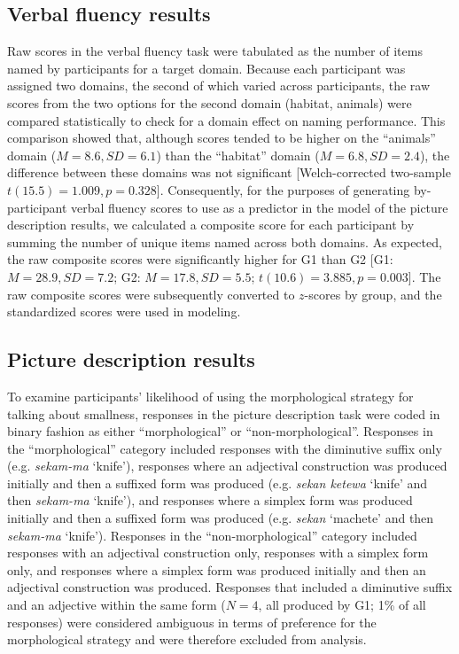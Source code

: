 \documentclass[output=paper,colorlinks,citecolor=brown]{langscibook}
\begin{document}
\subsection{Verbal fluency results}
\label{VFTResultsSec}

Raw scores in the verbal fluency task were tabulated as the number of items named by participants for a target domain. Because each participant was assigned two domains, the second of which varied across participants, the raw scores from the two options for the second domain (habitat, animals) were compared statistically to check for a domain effect on naming performance. This comparison showed that, although scores tended to be higher on the “animals” domain ($M=8.6, SD=6.1$) than the “habitat” domain ($M=6.8, SD=2.4$), the difference between these domains was not significant [Welch-corrected two-sample $t(15.5)=1.009, p=0.328$]. Consequently, for the purposes of generating by-participant verbal fluency scores to use as a predictor in the model of the picture description results, we calculated a composite score for each participant by summing the number of unique items named across both domains. As expected, the raw composite scores were significantly higher for G1 than G2 [G1: $M=28.9, SD=7.2$; G2: $M=17.8, SD=5.5$; $t(10.6)=3.885, p=0.003$]. The raw composite scores were subsequently converted to $z$-scores by group, and the standardized scores were used in modeling.

\subsection{Picture description results}
\label{PDTResultsSec}

To examine participants' likelihood of using the morphological strategy for talking about smallness, responses in the picture description task were coded in binary fashion as either “morphological” or “non-morphological”. Responses in the “morphological” category included responses with the diminutive suffix only (e.g. \textit{sekam-ma} `knife'), responses where an adjectival construction was produced initially and then a suffixed form was produced (e.g. \textit{sekan ketewa} `knife' and then \textit{sekam-ma} `knife'), and responses where a simplex form was produced initially and then a suffixed form was produced (e.g. \textit{sekan} `machete' and then \textit{sekam-ma} `knife'). Responses in the “non-morphological” category included responses with an adjectival construction only, responses with a simplex form only, and responses where a simplex form was produced initially and then an adjectival construction was produced. Responses that included a diminutive suffix and an adjective within the same form ($N=4$, all produced by G1; 1\% of all responses) were considered ambiguous in terms of preference for the morphological strategy and were therefore excluded from analysis. 
\end{document}
